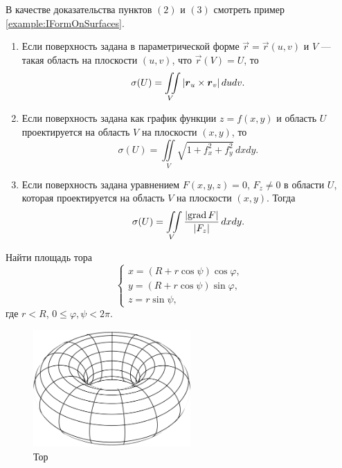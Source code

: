 \begin{example} В качестве доказательства пунктов $(2)$ и $(3)$ смотреть пример \ref{example:IFormOnSurfaces}.
	\begin{enumerate}[nolistsep, label=(\arabic*)]
		\item Если поверхность задана в параметрической форме $\vec{r} = \vec{r}(u, v)$ и $V$ --- такая область на плоскости $(u, v)$, что $\vec{r}(V) = U$, то
			\[
				\sigma(U) = \iint\limits_{V}\left\lvert\boldsymbol{r}_u \times \boldsymbol{r}_v\right\rvert dudv.
			\]
		\item Если поверхность задана как график функции $z = f(x, y)$ и область $U$ проектируется на область $V$ на плоскости $(x, y)$, то
			\[
				\sigma(U) = \iint\limits_{V}\sqrt{1 + f_x^2 + f_y^2}\,dxdy.
			\]
		\item Если поверхность задана уравнением $F(x, y, z) = 0$, $F_z \ne 0$ в области $U$, которая проектируется на область $V$ на плоскости $(x, y)$. Тогда
			\[
				\sigma(U) = \iint\limits_{V}\frac{\left\lvert\operatorname{grad} F\right\rvert}{\left\lvert F_z\right\rvert}\,dxdy.
			\]
	\end{enumerate}
\end{example}

\begin{problem}
	Найти площадь тора
	\[
		\begin{cases}
			x = (R + r\cos\psi)\cos\varphi,\\
			y = (R + r\cos\psi)\sin\varphi,\\
			z = r\sin\psi,
		\end{cases}
	\]
	где $r < R$, $0 \leqslant \varphi, \psi < 2\pi$.
\end{problem}

\begin{figure}[H]
	\centering
	\includegraphics[width=6cm]{./img/Torus.pdf}
	\caption{Тор}
\end{figure}

